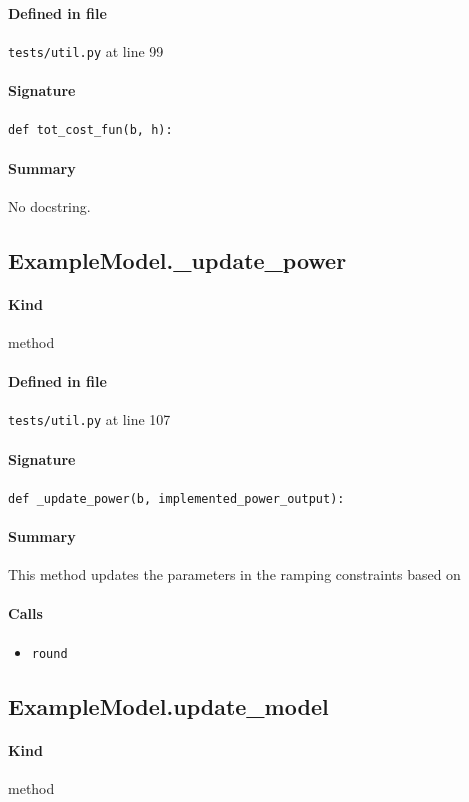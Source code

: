 \documentclass[11pt]{report}
\begin{document}
\paragraph{Defined in file} \texttt{tests/util.py} at line 99
\paragraph{Signature} \texttt{def tot\_cost\_fun(b, h):}
\paragraph{Summary} No docstring.
\subsection{ExampleModel.\_update\_power}
\label{def:tests-util.py:ExampleModel._update_power:L107}
\paragraph{Kind} method
\paragraph{Defined in file} \texttt{tests/util.py} at line 107
\paragraph{Signature} \texttt{def \_update\_power(b, implemented\_power\_output):}
\paragraph{Summary} This method updates the parameters in the ramping constraints based on
\paragraph{Calls}
\begin{itemize}[leftmargin=*]
  \item \texttt{round}
\end{itemize}
\subsection{ExampleModel.update\_model}
\label{def:tests-util.py:ExampleModel.update_model:L124}
\paragraph{Kind} method
\end{document}

